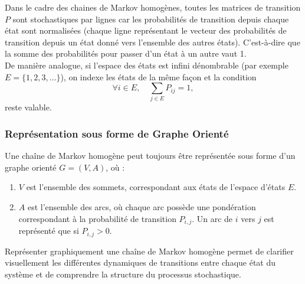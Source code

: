 \documentclass{article}
\begin{document}
Dans le cadre des chaines de Markov homogènes, toutes les matrices de transition $P$ sont stochastiques par lignes car les probabilités de transition depuis chaque état sont normalisées (chaque ligne représentant le vecteur des probabilités de transition depuis un état donné vers l’ensemble des autres états). C'est-à-dire que la somme des probabilités pour passer d'un état à un autre vaut 1. \\

De manière analogue, si l'espace des états est infini dénombrable (par exemple $E = \{1, 2, 3, \dots\}$), on indexe les états de la même façon et la condition
\[
\forall i \in E, \quad \sum_{j \in E} P_{ij} = 1,
\]
reste valable.

\subsubsection{Représentation sous forme de Graphe Orienté}
\label{subsubsec: Représentation sous forme de graphe orienté}

\begin{tcolorbox}[colback=white,colframe=red!80!black,title=Graphe Orienté d'une Chaîne de Markov]
Une chaîne de Markov homogène peut toujours être représentée sous forme d'un graphe orienté $ G = (V, A) $, où :
\begin{enumerate}[leftmargin=5em, label=(\arabic*)]
    \item $ V $ est l'ensemble des sommets, correspondant aux états de l'espace d'états $ E $.
    \item $ A $ est l'ensemble des arcs, où chaque arc possède une pondération correspondant à la probabilité de transition $P_{i,j}$. Un arc de $i$ vers $j$ est représenté que si $P_{i,j} > 0$.
\end{enumerate}
\end{tcolorbox}

Représenter graphiquement une chaîne de Markov homogène permet de clarifier visuellement les différentes dynamiques de transitions entre chaque état du système et de comprendre la structure du processus stochastique. \\
\end{document}
